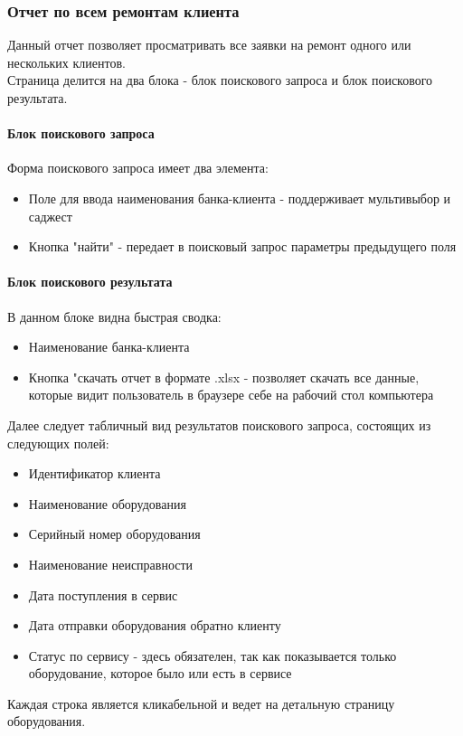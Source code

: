 \documentclass[DIV=calc, paper=a4, fontsize=11pt]{scrartcl} %
\begin{document}
\subsubsection{Отчет по всем ремонтам клиента} 
Данный отчет позволяет просматривать все заявки на ремонт одного или нескольких клиентов.
\\[0.5cm]
Страница делится на два блока - блок поискового запроса и блок поискового результата.
\paragraph{Блок поискового запроса}
Форма поискового запроса имеет два элемента:

\begin{itemize}
	\item Поле для ввода наименования банка-клиента  - поддерживает мультивыбор и саджест
	\item Кнопка "найти" - передает в поисковый запрос параметры предыдущего поля
\end{itemize}

\paragraph{Блок поискового результата}
В данном блоке видна быстрая сводка:

\begin{itemize}
	\item Наименование банка-клиента
	\item Кнопка "скачать отчет в формате .xlsx - позволяет скачать все данные, которые видит пользователь в браузере себе на рабочий стол компьютера
\end{itemize}

Далее следует табличный вид результатов поискового запроса, состоящих из следующих полей:

\begin{itemize}
	\item Идентификатор клиента
	\item Наименование оборудования
	\item Серийный номер оборудования
	\item Наименование неисправности
	\item Дата поступления в сервис
	\item Дата отправки оборудования обратно клиенту
	\item Статус по сервису - здесь обязателен, так как показывается только оборудование, которое было или есть в сервисе
\end{itemize}
Каждая строка является кликабельной и ведет на детальную страницу оборудования.
\end{document}
